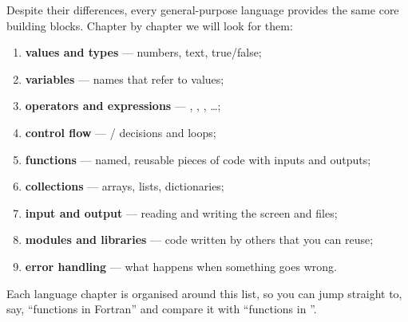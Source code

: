 Despite their differences, every general-purpose language provides the same core building
blocks. Chapter by chapter we will look for them:
\begin{enumerate}
\item \textbf{values and types} --- numbers, text, true/false;
\item \textbf{variables} --- names that refer to values;
\item \textbf{operators and expressions} --- \code{+}, \code{*}, \code{<}, 
  \ldots;
\item \textbf{control flow} --- / decisions and loops;
\item \textbf{functions} --- named, reusable pieces of code with inputs and outputs;
\item \textbf{collections} --- arrays, lists, dictionaries;
\item \textbf{input and output} --- reading and writing the screen and files;
\item \textbf{modules and libraries} --- code written by others that you can reuse;
\item \textbf{error handling} --- what happens when something goes wrong.
\end{enumerate}
Each language chapter is organised around this list, so you can jump straight to, say,
``functions in Fortran'' and compare it with ``functions in \py''.

